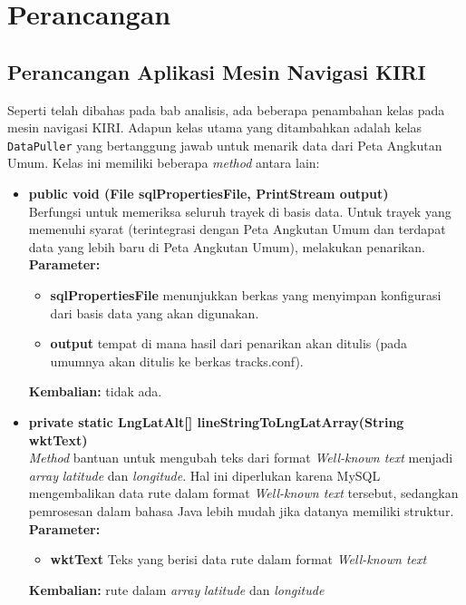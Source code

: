 \chapter{Perancangan}

\section{Perancangan Aplikasi Mesin Navigasi KIRI}

Seperti telah dibahas pada bab analisis, ada beberapa penambahan kelas pada mesin navigasi KIRI. Adapun kelas utama yang ditambahkan adalah kelas \texttt{DataPuller} yang bertanggung jawab untuk menarik data dari Peta Angkutan Umum. Kelas ini memiliki beberapa \textit{method} antara lain:

\begin{itemize}
	\item \textbf{public void (File sqlPropertiesFile, PrintStream output)} \\
		Berfungsi untuk memeriksa seluruh trayek di basis data. Untuk trayek yang memenuhi syarat (terintegrasi dengan Peta Angkutan Umum dan terdapat data yang lebih baru di Peta Angkutan Umum), melakukan penarikan. \\
		\textbf{Parameter:}
		\begin{itemize}
			\item \textbf{sqlPropertiesFile} menunjukkan berkas yang menyimpan konfigurasi dari basis data yang akan digunakan.
			\item \textbf{output} tempat di mana hasil dari penarikan akan ditulis (pada umumnya akan ditulis ke berkas tracks.conf).
		\end{itemize}
		\textbf{Kembalian:} tidak ada.
	\item \textbf{private static LngLatAlt[] lineStringToLngLatArray(String wktText)} \\
		\textit{Method} bantuan untuk mengubah teks dari format \textit{Well-known text} \cite{Herring:2011} menjadi \textit{array} \textit{latitude} dan \textit{longitude}. Hal ini diperlukan karena MySQL mengembalikan data rute dalam format \textit{Well-known text} tersebut, sedangkan pemrosesan dalam bahasa Java lebih mudah jika datanya memiliki struktur. \\
		\textbf{Parameter:}
		\begin{itemize}
			\item \textbf{wktText} Teks yang berisi data rute dalam format \textit{Well-known text}
		\end{itemize}
		\textbf{Kembalian:} rute dalam \textit{array} \textit{latitude} dan \textit{longitude}

\end{itemize}
